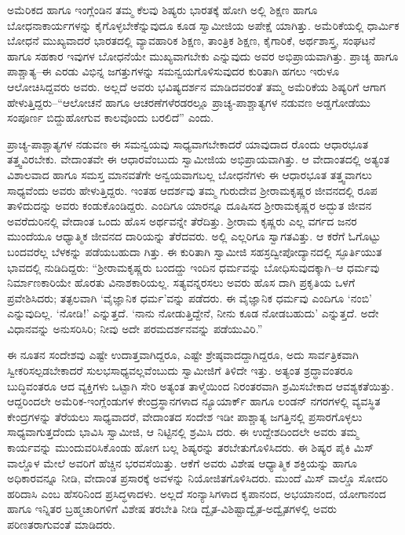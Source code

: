 ಅಮೆರಿಕದ ಹಾಗೂ ಇಂಗ್ಲೆಂಡಿನ ತಮ್ಮ ಕೆಲವು ಶಿಷ್ಯರು ಭಾರತಕ್ಕೆ ಹೋಗಿ ಅಲ್ಲಿ ಶಿಕ್ಷಣ ಹಾಗೂ ಬೋಧನಾಕಾರ್ಯಗಳನ್ನು ಕೈಗೊಳ್ಳಬೇಕೆನ್ನುವುದೂ ಕೂಡ ಸ್ವಾಮೀಜಿಯ ಅಪೇಕ್ಷೆ ಯಾಗಿತ್ತು. ಅಮೆರಿಕೆಯಲ್ಲಿ ಧಾರ್ಮಿಕ ಬೋಧನೆ ಮುಖ್ಯವಾದರೆ ಭಾರತದಲ್ಲಿ ವ್ಯಾವಹಾರಿಕ ಶಿಕ್ಷಣ, ತಾಂತ್ರಿಕ ಶಿಕ್ಷಣ, ಕೈಗಾರಿಕೆ, ಅರ್ಥಶಾಸ್ತ್ರ, ಸಂಘಟನೆ ಹಾಗೂ ಸಹಕಾರ ಇವುಗಳ ಬೋಧನೆಯೇ ಮುಖ್ಯವಾಗಬೇಕು ಎನ್ನುವುದು ಅವರ ಅಭಿಪ್ರಾಯವಾಗಿತ್ತು. ಪ್ರಾಚ್ಯ ಹಾಗೂ ಪಾಶ್ಚಾತ್ಯ–ಈ ಎರಡು ವಿಭಿನ್ನ ಜಗತ್ತುಗಳನ್ನು ಸಮನ್ವಯಗೊಳಿಸುವುದರ ಕುರಿತಾಗಿ ಹಗಲು ಇರುಳೂ ಆಲೋಚಿಸಿದ್ದವರು ಅವರು. ಅಲ್ಲದೆ ಅವರು ಭವಿಷ್ಯದರ್ಶನ ಮಾಡಿದವರಂತೆ ತಮ್ಮ ಅಮೆರಿಕೆಯ ಶಿಷ್ಯರಿಗೆ ಆಗಾಗ ಹೇಳುತ್ತಿದ್ದರು–“ಆಲೋಚನೆ ಹಾಗೂ ಆಚರಣೆಗಳೆರಡರಲ್ಲೂ ಪ್ರಾಚ್ಯ-ಪಾಶ್ಚಾತ್ಯಗಳ ನಡುವಣ ಅಡ್ಡಗೋಡೆಯು ಸಂಪೂರ್ಣ ಬಿದ್ದುಹೋಗುವ ಕಾಲವೊಂದು ಬರಲಿದೆ” ಎಂದು.

ಪ್ರಾಚ್ಯ-ಪಾಶ್ಚಾತ್ಯಗಳ ನಡುವಣ ಈ ಸಮನ್ವಯವು ಸಾಧ್ಯವಾಗಬೇಕಾದರೆ ಯಾವುದಾದ ರೊಂದು ಆಧಾರಭೂತ ತತ್ತ್ವವಿರಬೇಕು. ವೇದಾಂತವೇ ಈ ಆಧಾರವೆಂಬುದು ಸ್ವಾಮೀಜಿಯ ಅಭಿಪ್ರಾಯವಾಗಿತ್ತು. ಆ ವೇದಾಂತದಲ್ಲಿ ಅತ್ಯಂತ ವಿಶಾಲವಾದ ಹಾಗೂ ಸಮಸ್ತ ಮಾನವತೆಗೇ ಅನ್ವಯವಾಗಬಲ್ಲ ಬೋಧನೆಗಳು ಈ ಆಧಾರಭೂತ ತತ್ತ್ವವಾಗಲು ಸಾಧ್ಯವೆಂದು ಅವರು ಹೇಳುತ್ತಿದ್ದರು. ಇಂತಹ ಆದರ್ಶವು ತಮ್ಮ ಗುರುದೇವ ಶ್ರೀರಾಮಕೃಷ್ಣರ ಜೀವನದಲ್ಲಿ ರೂಪ ತಾಳಿದುದನ್ನು ಅವರು ಕಂಡುಕೊಂಡಿದ್ದರು. ಎಂದಿಗೂ ಯಾರನ್ನೂ ದೂಷಿಸದ ಶ್ರೀರಾಮಕೃಷ್ಣರ ಅದ್ಭುತ ಜೀವನ ಅವರೆದುರಿನಲ್ಲಿ ವೇದಾಂತ ಒಂದು ಹೊಸ ಅರ್ಥವನ್ನೇ ತೆರೆದಿತ್ತು. ಶ್ರೀರಾಮ ಕೃಷ್ಣರು ಎಲ್ಲ ವರ್ಗದ ಜನರ ಮುಂದೆಯೂ ಆಧ್ಯಾತ್ಮಿಕ ಜೀವನದ ದಾರಿಯನ್ನು ತೆರೆದವರು. ಅಲ್ಲಿ ಎಲ್ಲರಿಗೂ ಸ್ವಾಗತವಿತ್ತು. ಆ ಕರೆಗೆ ಓಗೊಟ್ಟು ಬಂದವರೆಲ್ಲ ಬೆಳಕನ್ನು ಪಡೆಯಬಹುದಾ ಗಿತ್ತು. ಈ ಕುರಿತಾಗಿ ಸ್ವಾಮೀಜಿ ಸಹಸ್ರದ್ವೀಪೋದ್ಯಾನದಲ್ಲಿ ಸ್ಫೂರ್ತಿಯುತ ಭಾವದಲ್ಲಿ ನುಡಿದಿದ್ದರು: “ಶ್ರೀರಾಮಕೃಷ್ಣರು ಬಂದದ್ದು ಇಂದಿನ ಧರ್ಮವನ್ನು ಬೋಧಿಸುವುದಕ್ಕಾಗಿ–ಆ ಧರ್ಮವು ನಿರ್ಮಾಣಕಾರಿಯೇ ಹೊರತು ವಿನಾಶಕಾರಿಯಲ್ಲ. ಸತ್ಯವನ್ನರಸಲು ಅವರು ಹೊಸ ದಾಗಿ ಪ್ರಕೃತಿಯ ಒಳಗೆ ಪ್ರವೇಶಿಸಿದರು; ತತ್ಫಲವಾಗಿ ‘ವೈಜ್ಞಾನಿಕ ಧರ್ಮ’ವನ್ನು ಪಡೆದರು. ಈ ವೈಜ್ಞಾನಿಕ ಧರ್ಮವು ಎಂದಿಗೂ ‘ನಂಬಿ’ ಎನ್ನುವುದಿಲ್ಲ. ‘ನೋಡಿ!’ ಎನ್ನುತ್ತದೆ. ‘ನಾನು ನೋಡುತ್ತಿದ್ದೇನೆ, ನೀನು ಕೂಡ ನೋಡಬಹುದು’ ಎನ್ನುತ್ತದೆ. ಅದೇ ವಿಧಾನವನ್ನು ಅನುಸರಿಸಿರಿ; ನೀವು ಅದೇ ಪರಮದರ್ಶನವನ್ನು ಪಡೆಯುವಿರಿ.”

ಈ ನೂತನ ಸಂದೇಶವು ಎಷ್ಟೇ ಉದಾತ್ತವಾಗಿದ್ದರೂ, ಎಷ್ಟೇ ಶ್ರೇಷ್ಠವಾದದ್ದಾಗಿದ್ದರೂ, ಅದು ಸಾರ್ವತ್ರಿಕವಾಗಿ ಸ್ವೀಕರಿಸಲ್ಪಡಬೇಕಾದರೆ ಸುಲಭಸಾಧ್ಯವಲ್ಲವೆಂಬುದು ಸ್ವಾಮೀಜಿಗೆ ತಿಳಿದೇ ಇತ್ತು. ಅತ್ಯಂತ ಶ್ರದ್ಧಾವಂತರೂ ಬುದ್ಧಿವಂತರೂ ಆದ ವ್ಯಕ್ತಿಗಳು ಒಟ್ಟಾಗಿ ಸೇರಿ ಅತ್ಯಂತ ತಾಳ್ಮೆಯಿಂದ ನಿರಂತರವಾಗಿ ಶ್ರಮಿಸಬೇಕಾದ ಆವಶ್ಯಕತೆಯಿತ್ತು. ಆದ್ದರಿಂದಲೇ ಅಮೆರಿಕ-ಇಂಗ್ಲೆಂಡುಗಳ ಕೇಂದ್ರಸ್ಥಾನಗಳಾದ ನ್ಯೂಯಾರ್ಕ್ ಹಾಗೂ ಲಂಡನ್ ನಗರಗಳಲ್ಲಿ ವ್ಯವಸ್ಥಿತ ಕೇಂದ್ರಗಳನ್ನು ತೆರೆಯಲು ಸಾಧ್ಯವಾದರೆ, ವೇದಾಂತದ ಸಂದೇಶ ಇಡೀ ಪಾಶ್ಚಾತ್ಯ ಜಗತ್ತಿನಲ್ಲಿ ಪ್ರಸಾರಗೊಳ್ಳಲು ಸಾಧ್ಯವಾಗುತ್ತದೆಂದು ಭಾವಿಸಿ ಸ್ವಾಮೀಜಿ, ಆ ನಿಟ್ಟಿನಲ್ಲಿ ಶ್ರಮಿಸಿ ದರು. ಈ ಉದ್ದೇಶದಿಂದಲೇ ಅವರು ತಮ್ಮ ಕಾರ್ಯವನ್ನು ಮುಂದುವರಿಸಿಕೊಂಡು ಹೋಗ ಬಲ್ಲ ಶಿಷ್ಯರನ್ನು ತರಬೇತುಗೊಳಿಸಿದರು. ಈ ಶಿಷ್ಯರ ಪೈಕಿ ಮಿಸ್ ವಾಲ್ಡೊಳ ಮೇಲೆ ಅವರಿಗೆ ಹೆಚ್ಚಿನ ಭರವಸೆಯಿತ್ತು. ಆಕೆಗೆ ಅವರು ವಿಶೇಷ ಆಧ್ಯಾತ್ಮಿಕ ಶಕ್ತಿಯನ್ನು ಹಾಗೂ ಅಧಿಕಾರವನ್ನೂ ನೀಡಿ, ವೇದಾಂತ ಪ್ರಸಾರಕ್ಕೆ ಅವಳನ್ನು ನಿಯೋಜಿತಗೊಳಿಸಿದರು. ಮುಂದೆ ಮಿಸ್ ವಾಲ್ಡೊ ಸೋದರಿ ಹರಿದಾಸಿ ಎಂಬ ಹೆಸರಿನಿಂದ ಪ್ರಸಿದ್ಧಳಾದಳು. ಅಲ್ಲದೆ ಸಂನ್ಯಾಸಿಗಳಾದ ಕೃಪಾನಂದ, ಅಭಯಾನಂದ, ಯೋಗಾನಂದ ಹಾಗೂ ಇನ್ನಿತರ ಬ್ರಹ್ಮಚಾರಿಗಳಿಗೆ ವಿಶೇಷ ತರಬೇತಿ ನೀಡಿ ದ್ವೈತ-ವಿಶಿಷ್ಟಾದ್ವೈತ-ಅದ್ವೈತಗಳಲ್ಲಿ ಅವರು ಪರಿಣತರಾಗುವಂತೆ ಮಾಡಿದರು.

